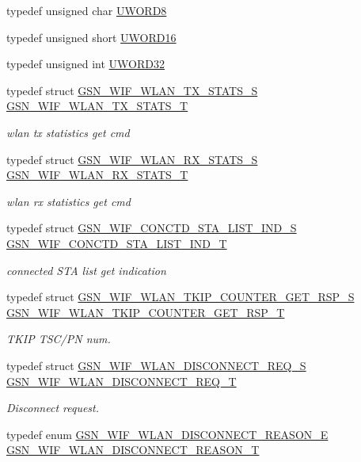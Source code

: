 \begin{DoxyCompactItemize}
typedef unsigned char \hyperlink{a00677_gad4e70fe7a239280a211703cce48b43da}{UWORD8}
\item 
typedef unsigned short \hyperlink{a00677_ga9346f50cd1a0569efeb685f429a562ff}{UWORD16}
\item 
typedef unsigned int \hyperlink{a00677_gad0599cef3ddc489e9b2fe8afc3159f12}{UWORD32}
\item 
typedef struct \hyperlink{a00410}{GSN\_\-WIF\_\-WLAN\_\-TX\_\-STATS\_\-S} \hyperlink{a00677_gadedc886d92dbab6910156f707795905d}{GSN\_\-WIF\_\-WLAN\_\-TX\_\-STATS\_\-T}
\begin{DoxyCompactList}\small\item\em wlan tx statistics get cmd \end{DoxyCompactList}\item 
typedef struct \hyperlink{a00398}{GSN\_\-WIF\_\-WLAN\_\-RX\_\-STATS\_\-S} \hyperlink{a00677_ga1bb08fff4c3ba2c6027ad054755e4df2}{GSN\_\-WIF\_\-WLAN\_\-RX\_\-STATS\_\-T}
\begin{DoxyCompactList}\small\item\em wlan rx statistics get cmd \end{DoxyCompactList}\item 
typedef struct \hyperlink{a00321}{GSN\_\-WIF\_\-CONCTD\_\-STA\_\-LIST\_\-IND\_\-S} \hyperlink{a00677_ga7709929fb1c332b2853a998d3b305561}{GSN\_\-WIF\_\-CONCTD\_\-STA\_\-LIST\_\-IND\_\-T}
\begin{DoxyCompactList}\small\item\em connected STA list get indication \end{DoxyCompactList}\item 
typedef struct \hyperlink{a00407}{GSN\_\-WIF\_\-WLAN\_\-TKIP\_\-COUNTER\_\-GET\_\-RSP\_\-S} \hyperlink{a00677_ga4c920262f319d5fe619f45ee687d827b}{GSN\_\-WIF\_\-WLAN\_\-TKIP\_\-COUNTER\_\-GET\_\-RSP\_\-T}
\begin{DoxyCompactList}\small\item\em TKIP TSC/PN num. \end{DoxyCompactList}\item 
typedef struct \hyperlink{a00380}{GSN\_\-WIF\_\-WLAN\_\-DISCONNECT\_\-REQ\_\-S} \hyperlink{a00677_gaf8a8c7854be001d295e7a84a9512a1d7}{GSN\_\-WIF\_\-WLAN\_\-DISCONNECT\_\-REQ\_\-T}
\begin{DoxyCompactList}\small\item\em Disconnect request. \end{DoxyCompactList}\item 
typedef enum \hyperlink{a00677_ga9dd854d0108dc49ff077a04e897e3518}{GSN\_\-WIF\_\-WLAN\_\-DISCONNECT\_\-REASON\_\-E} \hyperlink{a00677_ga59f311fc4d769ed3a162e48be5ea59aa}{GSN\_\-WIF\_\-WLAN\_\-DISCONNECT\_\-REASON\_\-T}

\end{DoxyCompactItemize}
